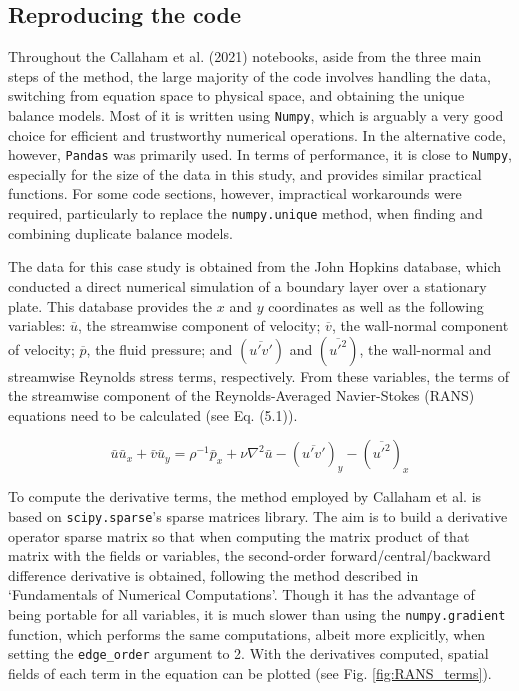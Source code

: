 \documentclass[12pt]{report} %
\begin{document}
\subsection{Reproducing the code}

Throughout the Callaham et al. (2021)\cite{callaham2021learning} notebooks, aside from the three main steps of the method, the large majority of the code involves handling the data, switching from equation space to physical space, and obtaining the unique balance models. Most of it is written using \texttt{Numpy}, which is arguably a very good choice for efficient and trustworthy numerical operations. In the alternative code, however, \texttt{Pandas} was primarily used. In terms of performance, it is close to \texttt{Numpy}, especially for the size of the data in this study, and provides similar practical functions. For some code sections, however, impractical workarounds were required, particularly to replace the \texttt{numpy.unique} method, when finding and combining duplicate balance models.

\vspace{5mm}

The data for this case study is obtained from the John Hopkins database, which conducted a direct numerical simulation of a boundary layer over a stationary plate\cite{jhtdb}. This database provides the $x$ and $y$ coordinates as well as the following variables: $\overline{u}$, the streamwise component of velocity;  $\overline{v}$, the wall-normal component of velocity;  $\overline{p}$, the fluid pressure; and $(\overline{u{\prime} v{\prime}})$ and $(\overline{u{\prime}^2})$, the wall-normal and streamwise Reynolds stress terms, respectively. From these variables, the terms of the streamwise component of the Reynolds-Averaged Navier-Stokes (RANS) equations need to be calculated (see Eq. (5.1)).

\begin{equation}
  \bar{u} \bar{u}_x + \bar{v} \bar{u}_y = \rho^{-1} \bar{p}_x + \nu \nabla^2 \bar{u}  - (\overline{u' v'})_y - (\overline{u'^2})_x
\end{equation}

To compute the derivative terms, the method employed by Callaham et al. is based on \texttt{scipy.sparse}’s sparse matrices library. The aim is to build a derivative operator sparse matrix so that when computing the matrix product of that matrix with the fields or variables, the second-order forward/central/backward difference derivative is obtained, following the method described in ‘Fundamentals of Numerical Computations’\cite{finitediff}. Though it has the advantage of being portable for all variables, it is much slower than using the \texttt{numpy.gradient} function, which performs the same computations, albeit more explicitly, when setting the \texttt{edge\_order} argument to 2. With the derivatives computed, spatial fields of each term in the equation can be plotted (see Fig. \ref{fig:RANS_terms}).
\end{document}

